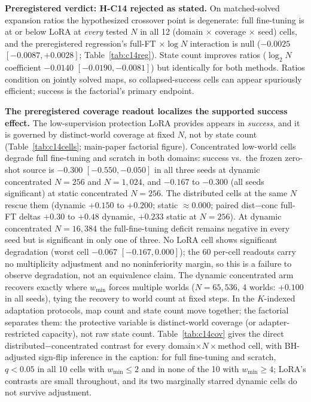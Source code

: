 \documentclass[letterpaper]{article} %
\begin{document}
\textbf{Preregistered verdict: H-C14 rejected as stated.} On matched-solved expansion ratios the hypothesized crossover point is degenerate: full fine-tuning is at or below LoRA at \emph{every} tested $N$ in all 12 (domain $\times$ coverage $\times$ seed) cells, and the preregistered regression's full-FT $\times \log N$ interaction is null ($-0.0025$ $[-0.0087, +0.0028]$; Table~\ref{tab:c14reg}). State count improves ratios ($\log_2 N$ coefficient $-0.0140$ $[-0.0190, -0.0081]$) but identically for both methods. Ratios condition on jointly solved maps, so collapsed-success cells can appear spuriously efficient; success is the factorial's primary endpoint.

\textbf{The preregistered coverage readout localizes the supported success effect.} The low-supervision protection LoRA provides appears in \emph{success}, and it is governed by distinct-world coverage at fixed $N$, not by state count (Table~\ref{tab:c14cells}; main-paper factorial figure). Concentrated low-world cells degrade full fine-tuning and scratch in both domains: success vs.\ the frozen zero-shot source is $-0.300$ $[-0.550,-0.050]$ in all three seeds at dynamic concentrated $N{=}256$ and $N{=}1{,}024$, and $-0.167$ to $-0.300$ (all seeds significant) at static concentrated $N{=}256$. The distributed cells at the same $N$ rescue them (dynamic $+0.150$ to $+0.200$; static $\approx 0.000$; paired dist$-$conc full-FT deltas $+0.30$ to $+0.48$ dynamic, $+0.233$ static at $N{=}256$). At dynamic concentrated $N{=}16{,}384$ the full-fine-tuning deficit remains negative in every seed but is significant in only one of three. No LoRA cell shows significant degradation (worst cell $-0.067$ $[-0.167, 0.000]$); the 60 per-cell readouts carry no multiplicity adjustment and no noninferiority margin, so this is a failure to observe degradation, not an equivalence claim. The dynamic concentrated arm recovers exactly where $w_{\min}$ forces multiple worlds ($N{=}65{,}536$, 4 worlds: $+0.100$ in all seeds), tying the recovery to world count at fixed steps. In the $K$-indexed adaptation protocols, map count and state count move together; the factorial separates them: the protective variable is distinct-world coverage (or adapter-restricted capacity), not raw state count. Table~\ref{tab:c14cov} gives the direct distributed$-$concentrated contrast for every domain$\times N\times$method cell, with BH-adjusted sign-flip inference in the caption: for full fine-tuning and scratch, $q{<}0.05$ in all 10 cells with $w_{\min} \leq 2$ and in none of the 10 with $w_{\min} \geq 4$; LoRA's contrasts are small throughout, and its two marginally starred dynamic cells do not survive adjustment.
\end{document}
